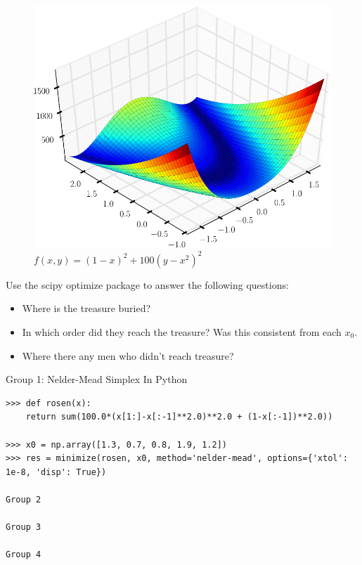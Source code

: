 \begin{figure}
\includegraphics[width=\textwidth]{Rosenbrock.pdf}
\caption{$f(x,y) = (1-x)^2 + 100(y-x^2)^2$}
\label{opt:rosenbrock}
\end{figure}

Use the scipy optimize package to answer the following questions:

\begin{itemize}

\item Where is the treasure buried?

\item In which order did they reach the treasure? Was this consistent from each $x_0$.

\item Where there any men who didn't reach treasure?

\end{itemize}

Group 1: Nelder-Mead Simplex
In Python

\begin{lstlisting}
>>> def rosen(x):
	return sum(100.0*(x[1:]-x[:-1]**2.0)**2.0 + (1-x[:-1])**2.0))

>>> x0 = np.array([1.3, 0.7, 0.8, 1.9, 1.2])
>>> res = minimize(rosen, x0, method='nelder-mead', options={'xtol': 1e-8, 'disp': True})

Group 2

Group 3

Group 4
\end{lstlisting}
